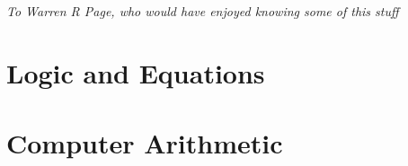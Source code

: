 \documentclass[letterpaper,10pt,extrafontsizesmtwoside,onecolumn,openright,fleqn]{memoir}
\begin{document}
\endgroup

\clearpage

\vspace*{\fill}

\begin{center}
\normalsize\textsf{\emph{To Warren R Page, who would have enjoyed knowing some of this stuff}}\par
\end{center}

\vspace*{\fill}

\cleardoublepage

\pagestyle{headings}

\setupshorttoc
\tableofcontents
\clearpage

\setupparasubsecs
\setupmaintoc
\tableofcontents



\clearpage
\listoffigures

\clearpage
\listofasides

\clearpage




\mainmatter

\raggedbottom

\part{Logic and Equations}











\part{Computer Arithmetic}







\end{document}
